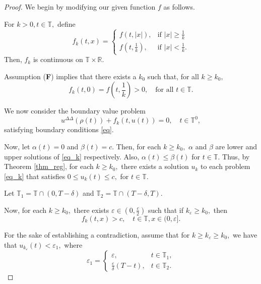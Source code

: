 \documentclass[12pt,reqno]{amsart}
\begin{document}
\begin{proof}
	We begin by modifying our given function $f$ as follows.
	
	For $k > 0, t \in \mathbb{T},$ define
	\begin{equation*}
	f_{k}(t,x) = \left\{\begin{array}{ll}
	f\left(t,|x|\right), & \text{if } |x| \geq \frac{1}{k} \\
	f\left(t,\frac{1}{k}\right), & \text{if } |x| < \frac{1}{k}.
	\end{array}\right.
	\end{equation*}
	Then, $f_{k}$ is continuous on $\mathbb{T} \times \mathbb{R}.$
	
	Assumption (\textbf{F}) implies that there exists a $k_{0}$ such that, for all $k \geq k_{0},$ $$f_{k}(t,0) = f\left(t,\frac{1}{k}\right) > 0, \quad \text{for all } t \in \mathbb{T}.$$
	
	We now consider the boundary value problem
	\begin{equation}\label{eq_k}
	u^{\Delta\Delta}(\rho(t)) + f_{k}(t, u(t)) = 0, \quad t \in \mathbb{T}^0,
	\end{equation}
	satisfying boundary conditions \eqref{eq}.
	
	Now, let $\alpha(t) = 0$ and $\beta(t) = c.$  Then, for each $k \geq k_{0},$ $\alpha$ and $\beta$ are lower and upper solutions of \eqref{eq_k} respectively.  Also, $\alpha(t) \leq \beta(t)$ for $t \in \mathbb{T}.$  Thus, by Theorem \ref{thm_reg}, for each $k \geq k_{0},$ there exists a solution $u_k$ to each problem \eqref{eq_k} that satisfies $0 \leq u_{k}(t) \leq c,$ for $t \in \mathbb{T}.$
	
	Let $\mathbb{T}_1 = \mathbb{T} \cap (0, T-\delta)$ and $\mathbb{T}_2 = \mathbb{T} \cap (T-\delta, T).$
	
	Now, for each $k \geq k_0,$ there exists $\varepsilon \in \left(0, \frac{c}{2}\right)$ such that if $k_{\varepsilon} \geq k_{0},$ then 
	\begin{equation}\label{fk}
		f_{k}(t, x) > c, \quad t \in \mathbb{T}, x \in (0, \varepsilon].
	\end{equation}
	
	For the sake of establishing a contradiction, assume that for $k \geq k_{\varepsilon} \geq k_0,$ we have that $u_{k_{\varepsilon}}(t) < \varepsilon_1,$ where 
	\begin{equation*}
		\varepsilon_1 = \left\{
		\begin{array}{ll}
			\varepsilon, & t \in \mathbb{T}_1, \\
			\frac{\varepsilon}{\delta}(T-t), & t \in \mathbb{T}_2.
		\end{array}
		\right.
	\end{equation*}
	

\end{proof}
\end{document}

